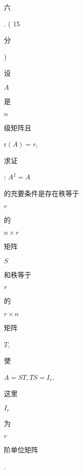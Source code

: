 \documentclass[10pt]{article}
\begin{document}
\begin{CJK}{UTF8}{mj}六\end{CJK}. ( 15 \begin{CJK}{UTF8}{mj}分\end{CJK}) \begin{CJK}{UTF8}{mj}设\end{CJK} $A$ \begin{CJK}{UTF8}{mj}是\end{CJK} $n$ \begin{CJK}{UTF8}{mj}级矩阵且\end{CJK} $\mathrm{r}(A)=r$, \begin{CJK}{UTF8}{mj}求证\end{CJK}: $A^{2}=A$ \begin{CJK}{UTF8}{mj}的充要条件是存在秩等于\end{CJK} $r$ \begin{CJK}{UTF8}{mj}的\end{CJK} $n \times r$ \begin{CJK}{UTF8}{mj}矩阵\end{CJK} $S$ \begin{CJK}{UTF8}{mj}和秩等于\end{CJK} $r$ \begin{CJK}{UTF8}{mj}的\end{CJK} $r \times n$ \begin{CJK}{UTF8}{mj}矩阵\end{CJK} $T$, \begin{CJK}{UTF8}{mj}使\end{CJK} $A=S T, T S=I_{r}$. \begin{CJK}{UTF8}{mj}这里\end{CJK} $I_{r}$ \begin{CJK}{UTF8}{mj}为\end{CJK} $r$ \begin{CJK}{UTF8}{mj}阶单位矩阵\end{CJK}.
\end{document}
